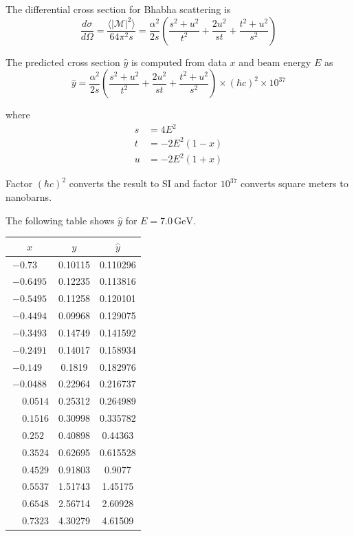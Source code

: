\documentclass[12pt]{article}
\begin{document}
\noindent
The differential cross section for Bhabha scattering is
\begin{equation*}
\frac{d\sigma}{d\Omega}
=\frac{\langle|\mathcal{M}|^2\rangle}{64\pi^2s}
=\frac{\alpha^2}{2s}
\left(\frac{s^2+u^2}{t^2}+\frac{2u^2}{st}+\frac{t^2+u^2}{s^2}\right)
\end{equation*}

\noindent
The predicted cross section $\hat{y}$ is computed from data $x$ and beam energy $E$ as
\begin{equation*}
\hat{y}
=\frac{\alpha^2}{2s}
\left(\frac{s^2+u^2}{t^2}+\frac{2u^2}{st}+\frac{t^2+u^2}{s^2}\right)
\times(\hbar c)^2
\times10^{37}
\end{equation*}

\noindent
where
\begin{align*}
s&=4E^2
\\
t&=-2E^2(1-x)
\\
u&=-2E^2(1+x)
\end{align*}

\noindent
Factor $(\hbar c)^2$ converts the result to SI and factor $10^{37}$ converts square meters to nanobarns.

\bigskip
\noindent
The following table shows $\hat{y}$ for $E=7.0\,\text{GeV}$.

\begin{center}
\begin{tabular}{|c|c|c|}
\hline
$x$ & $y$ & $\hat{y}$\\
\hline
$-0.73\phantom{00}$ & 0.10115 & 0.110296\\
$-0.6495$ & 0.12235 & 0.113816\\
$-0.5495$ & 0.11258 & 0.120101\\
$-0.4494$ & 0.09968 & 0.129075\\
$-0.3493$ & 0.14749 & 0.141592\\
$-0.2491$ & 0.14017 & 0.158934\\
$-0.149\phantom{0}$ & 0.1819\phantom{0} & 0.182976\\
$-0.0488$ & 0.22964 & 0.216737\\
$\phantom{+}0.0514$ & 0.25312 & 0.264989\\
$\phantom{+}0.1516$ & 0.30998 & 0.335782\\
$\phantom{+}0.252\phantom{0}$ & 0.40898 & 0.44363\phantom{0}\\
$\phantom{+}0.3524$ & 0.62695 & 0.615528\\
$\phantom{+}0.4529$ & 0.91803 & 0.9077\phantom{00}\\
$\phantom{+}0.5537$ & 1.51743 & 1.45175\phantom{0}\\
$\phantom{+}0.6548$ & 2.56714 & 2.60928\phantom{0}\\
$\phantom{+}0.7323$ & 4.30279 & 4.61509\phantom{0}\\
\hline
\end{tabular}
\end{center}
\end{document}
